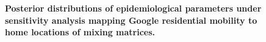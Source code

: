 \begin{figure}[ht]
    \caption{\textbf{Posterior distributions of epidemiological parameters under sensitivity analysis mapping Google residential mobility to home locations of mixing matrices.}}
    \label{fig:residential_sensitivity_epi_params}
\end{figure}
